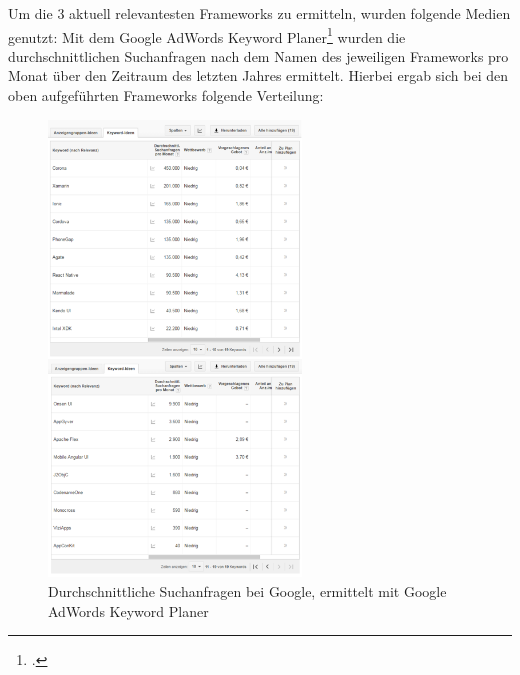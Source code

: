 Um die 3 aktuell relevantesten Frameworks zu ermitteln, wurden folgende Medien genutzt: Mit dem Google AdWords Keyword Planer\footcite{KeyWordPlaner} wurden die durchschnittlichen Suchanfragen nach dem Namen des jeweiligen Frameworks pro Monat über den Zeitraum des letzten Jahres ermittelt. Hierbei ergab sich bei den oben aufgeführten Frameworks folgende Verteilung:
\clearpage
\begin{figure}[h]
	\centering
	\includegraphics[width=0.6\textwidth]{Bilder/Durchschnittliche_Suchanfragen_gesamt.PNG}
	\caption{Durchschnittliche Suchanfragen bei Google, ermittelt mit Google AdWords Keyword Planer}
	\label{fig:Suchanfragen1}
\end{figure}

